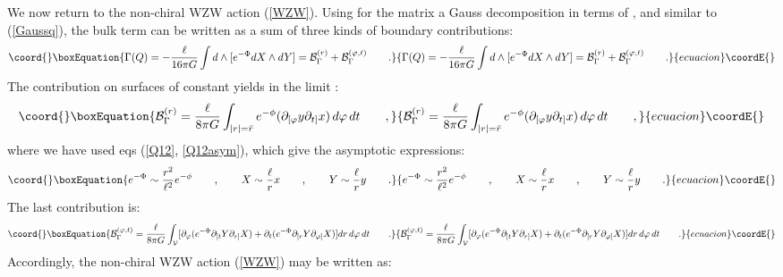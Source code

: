 \documentclass[a4paper,10pt]{article}
\begin{document}
We now return to the non-chiral WZW action (\ref{WZW}). 
Using for the matrix \coordHE{} a Gauss decomposition in terms of 
\myHighlight{$\Phi$}\coordHE{}, \coordHE{} and \coordHE{} similar to (\ref{Gaussq}),
the bulk term \coordHE{} can be written as a sum of three
kinds of boundary contributions:
\begin{equation}\coord{}\boxEquation{
\Gamma(Q)=- \frac {\ell} {16 \pi G} \int d \wedge [e^{-\Phi} dX \wedge dY]
={\cal B}^{(r)}_\Gamma +  {\cal B}^{(\varphi,t)}_\Gamma
\qquad .
}{
\Gamma(Q)=- \frac {\ell} {16 \pi G} \int d \wedge [e^{-\Phi} dX \wedge dY]
={\cal B}^{(r)}_\Gamma +  {\cal B}^{(\varphi,t)}_\Gamma
\qquad .
}{ecuacion}\coordE{}\end{equation}
The contribution on surfaces of 
constant \coordHE{} yields in the limit \coordHE{}:
\begin{equation}\coord{}\boxEquation{
\label{BG}
{\cal B}^{(r)}_\Gamma= \frac {\ell} {8 \pi G} \int_{|r|=\bar r} 
e^{-\phi}( \partial_{[\varphi} y \partial_{t]} x ) \, d\varphi \, dt
 \qquad ,
}{
{\cal B}^{(r)}_\Gamma= \frac {\ell} {8 \pi G} \int_{|r|=\bar r} 
e^{-\phi}( \partial_{[\varphi} y \partial_{t]} x ) \, d\varphi \, dt
 \qquad ,
}{ecuacion}\coordE{}\end{equation}
where we have used eqs (\ref{Q12}, \ref{Q12asym}), which give
the asymptotic expressions:
\begin{equation}\coord{}\boxEquation{
\label{AXYPHI}
e^{-\Phi}\sim \frac {r^2}{\ell^2} e^{-\phi} \qquad , \qquad
X \sim \frac \ell r x  \qquad , \qquad Y \sim \frac \ell r y 
\qquad .
}{
e^{-\Phi}\sim \frac {r^2}{\ell^2} e^{-\phi} \qquad , \qquad
X \sim \frac \ell r x  \qquad , \qquad Y \sim \frac \ell r y 
\qquad .
}{ecuacion}\coordE{}\end{equation}
The last contribution is:
\begin{equation}\coord{}\boxEquation{
\label{BL}
{\cal B}^{(\varphi,t)}_\Gamma  = \frac {\ell} {8 \pi G} 
\int_{\cal V} [ \partial_\varphi
( e^{-\Phi} \partial_{[t} Y \partial_{r]} X) +
\partial_t
( e^{-\Phi} \partial_{[r} Y \partial_{\varphi]} X)]
 dr\, d\varphi\, dt \qquad .
}{
{\cal B}^{(\varphi,t)}_\Gamma  = \frac {\ell} {8 \pi G} 
\int_{\cal V} [ \partial_\varphi
( e^{-\Phi} \partial_{[t} Y \partial_{r]} X) +
\partial_t
( e^{-\Phi} \partial_{[r} Y \partial_{\varphi]} X)]
 dr\, d\varphi\, dt \qquad .
}{ecuacion}\coordE{}\end{equation}
Accordingly, the non-chiral WZW action (\ref{WZW}) may be written as:
\end{document}
